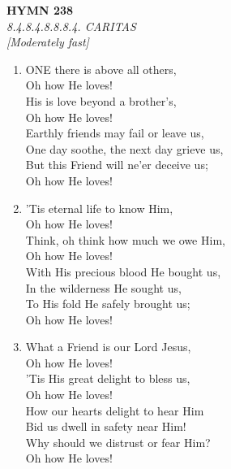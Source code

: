 \documentclass[11pt,a4paper]{article}
\begin{document}
\begin{enumerate}
\end{enumerate}

\newpage
\begin{center}
    {\Large \textbf{HYMN 238}}
    \\
    \textit{8.4.8.4.8.8.8.4. CARITAS}
    \\
    \textit{\small [Moderately fast]}
\end{center}
\vspace{1em}

\begin{enumerate}
    \item ONE there is above all others, \\
            Oh how He loves! \\
        His is love beyond a brother's, \\
            Oh how He loves! \\
        Earthly friends may fail or leave us, \\
        One day soothe, the next day grieve us, \\
        But this Friend will ne'er deceive us; \\
            Oh how He loves!

    \item 'Tis eternal life to know Him, \\
            Oh how He loves! \\
        Think, oh think how much we owe Him, \\
            Oh how He loves! \\
        With His precious blood He bought us, \\
        In the wilderness He sought us, \\
        To His fold He safely brought us; \\
            Oh how He loves!

    \item What a Friend is our Lord Jesus, \\
            Oh how He loves! \\
        'Tis His great delight to bless us, \\
            Oh how He loves! \\
        How our hearts delight to hear Him \\
        Bid us dwell in safety near Him! \\
        Why should we distrust or fear Him? \\
            Oh how He loves!


\end{enumerate}
\end{document}
